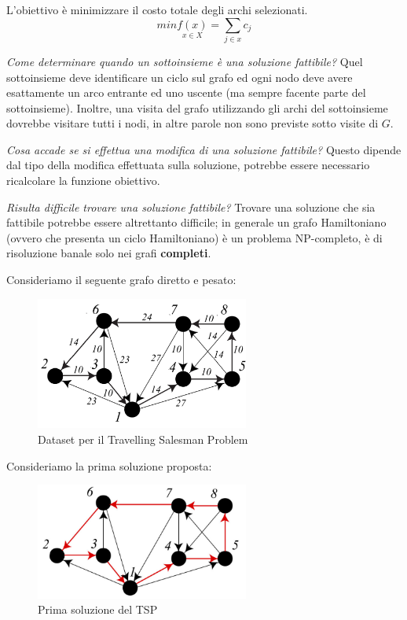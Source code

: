 \documentclass{article}
\begin{document}
L'obiettivo è minimizzare il costo totale degli archi selezionati.
$$min\underset{x\in X}{f(x)}=\sum_{j\in x}c_j$$

\textit{Come determinare quando un sottoinsieme è una soluzione fattibile?} Quel sottoinsieme deve identificare
un ciclo sul grafo ed ogni nodo deve avere esattamente un arco entrante ed uno uscente (ma sempre facente parte
del sottoinsieme). Inoltre, una visita del grafo utilizzando gli archi del sottoinsieme dovrebbe visitare tutti i
nodi, in altre parole non sono previste sotto visite di $G$.

\textit{Cosa accade se si effettua una modifica di una soluzione fattibile?} Questo dipende dal tipo della modifica
effettuata sulla soluzione, potrebbe essere necessario ricalcolare la funzione obiettivo.

\textit{Risulta difficile trovare una soluzione fattibile?} Trovare una soluzione che sia fattibile
potrebbe essere altrettanto difficile; in generale un grafo Hamiltoniano (ovvero che presenta un
ciclo Hamiltoniano) è un problema NP-completo, è di risoluzione banale solo nei grafi \textbf{completi}.

Consideriamo il seguente grafo diretto e pesato:
\begin{figure}[H]
    \centering
    \includegraphics[width=7cm]{images/TSP_dataset.png}
    \caption{Dataset per il Travelling Salesman Problem}
    \label{fig:tsp_dataset}
\end{figure}

Consideriamo la prima soluzione proposta:
\begin{figure}[H]
    \centering
    \includegraphics[width=7cm]{images/TSP_sol1.png}
    \caption{Prima soluzione del TSP}
    \label{fig:tsp_1_sol}
\end{figure}
\end{document}
